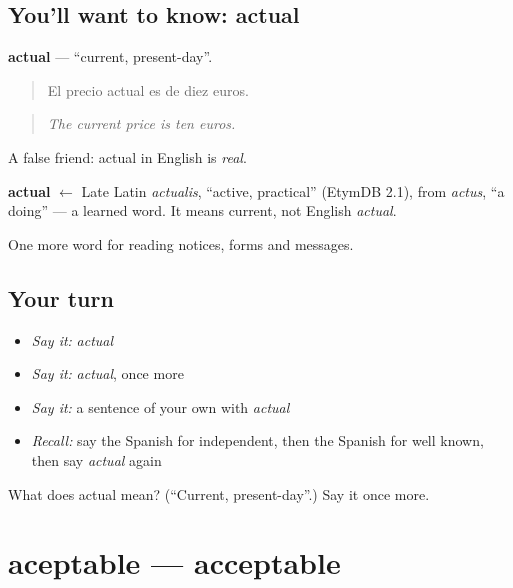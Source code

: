 \subsection*{You'll want to know: actual}
\textbf{actual} — \textquotedblleft{}current, present-day\textquotedblright{}.

\begin{quote}
El precio actual es de diez euros.
\end{quote}

\begin{quote}
\emph{The current price is ten euros.}
\end{quote}

A false friend: actual in English is \emph{real}.

\begin{cousinweb}
\textbf{actual} $\leftarrow$ Late Latin \emph{actualis}, \textquotedblleft{}active, practical\textquotedblright{} (EtymDB 2.1), from \emph{actus}, \textquotedblleft{}a doing\textquotedblright{} — a learned word. It means current, not English \emph{actual}.
\end{cousinweb}

\begin{grammarlens}[title={What you've built}]
One more word for reading notices, forms and messages.
\end{grammarlens}

\subsection*{Your turn}
\begin{itemize}
\raggedright
  \item \emph{Say it:} \emph{actual}
  \item \emph{Say it:} \emph{actual}, once more
  \item \emph{Say it:} a sentence of your own with \emph{actual}
  \item \emph{Recall:} say the Spanish for independent, then the Spanish for well known, then say \emph{actual} again
\end{itemize}

\begin{tcolorbox}[breakable,colback=teal!4,colframe=teal!35!black,title={Before you move on}]
What does actual mean? (\textquotedblleft{}Current, present-day\textquotedblright{}.) Say it once more.
\end{tcolorbox}
\section[aceptable]{aceptable — acceptable}

